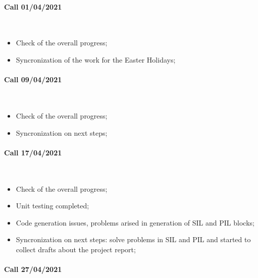 \documentclass[12pt,a4paper]{report}
\begin{document}
\paragraph{Call 01/04/2021 \\}~

\begin{itemize}
	\item Check of the overall progress;
	
	\item Syncronization of the work for the Easter Holidays;

\end{itemize}

\paragraph{Call 09/04/2021 \\}~

\begin{itemize}
	\item Check of the overall progress;
	
	\item Syncronization on next steps;
	
\end{itemize}

\paragraph{Call 17/04/2021 \\}~

\begin{itemize}
	\item Check of the overall progress;
	
	\item Unit testing completed;
	
	\item Code generation issues, problems arised in generation of SIL and PIL blocks;
	
	\item Syncronization on next steps: solve problems in SIL and PIL and started to collect drafts about the project report;
	
\end{itemize}

\paragraph{Call 27/04/2021 \\}~
\end{document}
